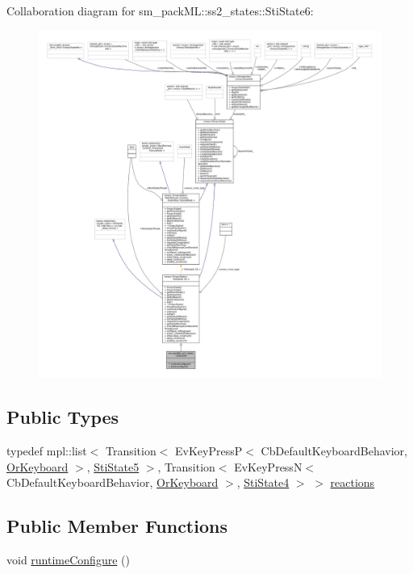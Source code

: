 Collaboration diagram for sm\+\_\+pack\+ML\+:\+:ss2\+\_\+states\+:\+:Sti\+State6\+:
\nopagebreak
\begin{figure}[H]
\begin{center}
\leavevmode
\includegraphics[width=350pt]{structsm__packML_1_1ss2__states_1_1StiState6__coll__graph}
\end{center}
\end{figure}
\subsection*{Public Types}
\begin{DoxyCompactItemize}
\item 
typedef mpl\+::list$<$ Transition$<$ Ev\+Key\+PressP$<$ Cb\+Default\+Keyboard\+Behavior, \hyperlink{classsm__packML_1_1OrKeyboard}{Or\+Keyboard} $>$, \hyperlink{structsm__packML_1_1ss2__states_1_1StiState5}{Sti\+State5} $>$, Transition$<$ Ev\+Key\+PressN$<$ Cb\+Default\+Keyboard\+Behavior, \hyperlink{classsm__packML_1_1OrKeyboard}{Or\+Keyboard} $>$, \hyperlink{structsm__packML_1_1ss2__states_1_1StiState4}{Sti\+State4} $>$ $>$ \hyperlink{structsm__packML_1_1ss2__states_1_1StiState6_accbaf5ea9fbf21a028103e5eb0842738}{reactions}
\end{DoxyCompactItemize}
\subsection*{Public Member Functions}
\begin{DoxyCompactItemize}
\item 
void \hyperlink{structsm__packML_1_1ss2__states_1_1StiState6_a336677b07e8f117f27f3fcff5e3663ae}{runtime\+Configure} ()
\end{DoxyCompactItemize}
